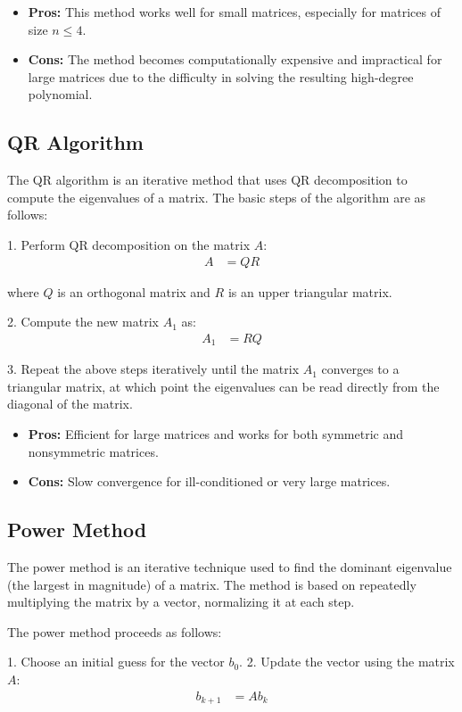 \documentclass[article]{IEEEtran}
\numberwithin{equation}{enumi}
\numberwithin{figure}{enumi}
\begin{document}
\begin{itemize}
    \item \textbf{Pros:} This method works well for small matrices, especially for matrices of size $n \leq 4$.
    \item \textbf{Cons:} The method becomes computationally expensive and impractical for large matrices due to the difficulty in solving the resulting high-degree polynomial.
\end{itemize}

\subsection{QR Algorithm}
The QR algorithm is an iterative method that uses QR decomposition to compute the eigenvalues of a matrix. The basic steps of the algorithm are as follows:

1. Perform QR decomposition on the matrix $A$:
\begin{align*}
A &= QR
\end{align*}

where $Q$ is an orthogonal matrix and $R$ is an upper triangular matrix.

2. Compute the new matrix $A_1$ as:
\begin{align*}
A_1 &= RQ
\end{align*}

3. Repeat the above steps iteratively until the matrix $A_1$ converges to a triangular matrix, at which point the eigenvalues can be read directly from the diagonal of the matrix.

\begin{itemize}
    \item \textbf{Pros:} Efficient for large matrices and works for both symmetric and nonsymmetric matrices.
    \item \textbf{Cons:} Slow convergence for ill-conditioned or very large matrices.
\end{itemize}

\subsection{Power Method}
The power method is an iterative technique used to find the dominant eigenvalue (the largest in magnitude) of a matrix. The method is based on repeatedly multiplying the matrix by a vector, normalizing it at each step.

The power method proceeds as follows:

1. Choose an initial guess for the vector $b_0$.
2. Update the vector using the matrix $A$:
\begin{align*}
b_{k+1} &= A b_k
\end{align*}
\end{document}
